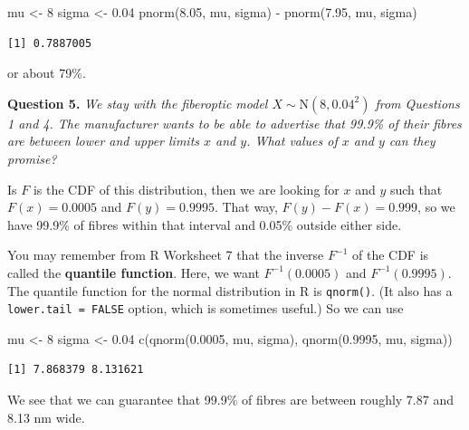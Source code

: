 \documentclass[
  letterpaper,
]{report}
\newenvironment{Shaded}{\begin{snugshade}}{\end{snugshade}}
\newcommand{\DecValTok}[1]{\textcolor[rgb]{0.68,0.00,0.00}{#1}}
\newcommand{\FloatTok}[1]{\textcolor[rgb]{0.68,0.00,0.00}{#1}}
\newcommand{\FunctionTok}[1]{\textcolor[rgb]{0.28,0.35,0.67}{#1}}
\newcommand{\NormalTok}[1]{\textcolor[rgb]{0.00,0.23,0.31}{#1}}
\newcommand{\OtherTok}[1]{\textcolor[rgb]{0.00,0.23,0.31}{#1}}
\newcommand{\SpecialCharTok}[1]{\textcolor[rgb]{0.37,0.37,0.37}{#1}}
\theoremstyle{definition}
\theoremstyle{definition}
\theoremstyle{remark}
\begin{document}
\begin{Shaded}
\begin{Highlighting}[]
\NormalTok{mu }\OtherTok{\textless{}{-}} \DecValTok{8}
\NormalTok{sigma }\OtherTok{\textless{}{-}} \FloatTok{0.04}
\FunctionTok{pnorm}\NormalTok{(}\FloatTok{8.05}\NormalTok{, mu, sigma) }\SpecialCharTok{{-}} \FunctionTok{pnorm}\NormalTok{(}\FloatTok{7.95}\NormalTok{, mu, sigma)}
\end{Highlighting}
\end{Shaded}

\begin{verbatim}
[1] 0.7887005
\end{verbatim}

or about 79\%.

\textbf{Question 5.} \emph{We stay with the fiberoptic model
\(X \sim \mathrm{N}(8, 0.04^2)\) from Questions 1 and 4. The
manufacturer wants to be able to advertise that 99.9\% of their fibres
are between lower and upper limits \(x\) and \(y\). What values of \(x\)
and \(y\) can they promise?}

Is \(F\) is the CDF of this distribution, then we are looking for \(x\)
and \(y\) such that \(F(x) = 0.0005\) and \(F(y) = 0.9995\). That way,
\(F(y) - F(x) = 0.999\), so we have 99.9\% of fibres within that
interval and 0.05\% outside either side.

You may remember from R Worksheet 7 that the inverse \(F^{-1}\) of the
CDF is called the \textbf{quantile function}. Here, we want
\(F^{-1}(0.0005)\) and \(F^{-1}(0.9995)\). The quantile function for the
normal distribution in R is \texttt{qnorm()}. (It also has a
\texttt{lower.tail\ =\ FALSE} option, which is sometimes useful.) So we
can use

\begin{Shaded}
\begin{Highlighting}[]
\NormalTok{mu }\OtherTok{\textless{}{-}} \DecValTok{8}
\NormalTok{sigma }\OtherTok{\textless{}{-}} \FloatTok{0.04}
\FunctionTok{c}\NormalTok{(}\FunctionTok{qnorm}\NormalTok{(}\FloatTok{0.0005}\NormalTok{, mu, sigma), }\FunctionTok{qnorm}\NormalTok{(}\FloatTok{0.9995}\NormalTok{, mu, sigma))}
\end{Highlighting}
\end{Shaded}

\begin{verbatim}
[1] 7.868379 8.131621
\end{verbatim}

We see that we can guarantee that 99.9\% of fibres are between roughly
7.87 and 8.13 nm wide.
\end{document}
